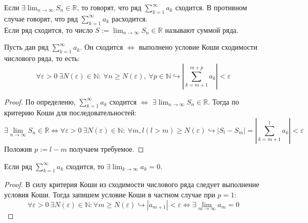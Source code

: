 \documentclass[11pt]{article}
\begin{document}
\begin{definition}
    Если $\displaystyle \exists \lim_{n \to \infty} S_n \in \mathbb{R}$, то говорят,
    что ряд $\displaystyle \sum_{k = 1}^{\infty} a_k$ сходится. В противном случае говорят,
    что ряд $\displaystyle \sum_{k = 1}^{\infty} a_k$ расходится. \\ 
    Если ряд сходится, то число $\displaystyle S := \lim_{n \to \infty} S_n \in \mathbb{R}$
    называют суммой ряда.
\end{definition}

\begin{theorem}
    Пусть дан ряд $\displaystyle \sum_{k = 1}^{\infty} a_k$. Он сходится $\Longleftrightarrow$
    выполнено условие Коши сходимости числового ряда, то есть:
    \[\forall \varepsilon > 0 \ \exists N(\varepsilon) \in \mathbb{N}: \ \forall n 
    \geq N(\varepsilon), \ \forall p \in \mathbb{N} \hookrightarrow \left| \sum_{k = m + 1}^{m + p}
    a_k \right| < \varepsilon\]    
\end{theorem}

\begin{proof}
    По определеню, $\displaystyle \sum_{k = 1}^{\infty} a_k$ сходится $\Longleftrightarrow$
    $\displaystyle \exists \lim_{n \to \infty} S_n \in \mathbb{R}$. Тогда по критерию 
    Коши для последовательностей: \[\exists \lim_{n \to \infty} S_n \in \mathbb{R}
    \Longleftrightarrow \forall \varepsilon > 0 \ \exists N(\varepsilon) \in \mathbb{N}:
     \ \forall m, l (l > m) \geq N(\varepsilon) \hookrightarrow \left|S_l - S_m\right| = 
    \left|\sum_{k = m + 1}^{l} a_k\right| < \varepsilon\]
    Положив $p := l - m$ получаем требуемое.
\end{proof}

\begin{theorem}
    Если ряд $\displaystyle \sum_{k = 1}^{\infty} a_k$ сходится, 
    то $\displaystyle \exists \lim_{k \to \infty} a_k = 0$.
\end{theorem}

\begin{proof}
    В силу критерия Коши из сходимости числового ряда следует выполнение условия Коши.
    Тогда запишем условие Коши в частном случае при $p = 1$:
    \[\forall \varepsilon > 0 \ \exists N(\varepsilon) \in \mathbb{N}: \forall m 
    \geq N(\varepsilon) \hookrightarrow |a_{m + 1}| < \varepsilon \Longleftrightarrow
    \exists \lim_{m \to \infty} a_m = 0\]
\end{proof}
\end{document}
